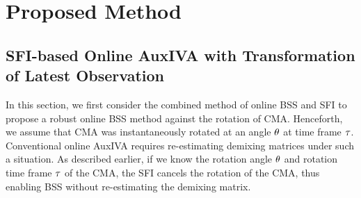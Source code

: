 \documentclass[sip,biber]{now-journal}
\begin{document}
\section{Proposed Method}\label{sec:proposed}

\subsection{SFI-based Online AuxIVA with Transformation of Latest Observation}

In this section, we first consider the combined method of online BSS and SFI \cite{Wakabayashi:2023:ASLP} to propose a robust online BSS method against the rotation of CMA.
Henceforth, we assume that CMA was instantaneously rotated at an angle $\theta$ at time frame $\tau$.
Conventional online AuxIVA requires re-estimating demixing matrices under such a situation.
As described earlier, if we know the rotation angle $\theta$ and rotation time frame $\tau$ of the CMA, the SFI cancels the rotation of the CMA, thus enabling BSS without re-estimating the demixing matrix.
\end{document}
